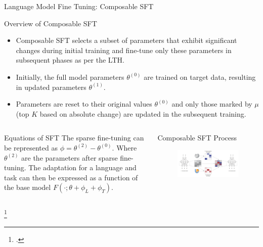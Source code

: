 \documentclass{beamer}
\begin{document}
	\begin{frame}{Language Model Fine Tuning: Composable SFT}
		\begin{block}{\scriptsize Overview of Composable SFT}\scriptsize
			\begin{itemize}
				\item Composable SFT selects a subset of parameters that exhibit significant changes during initial training and fine-tune only these parameters in subsequent phases as per the LTH.
				\item  Initially, the full model parameters $\theta^{(0)}$ are trained on target data, resulting in updated parameters $\theta^{(1)}$. 
				\item Parameters are reset to their original values $\theta^{(0)}$ and only those marked by $\mu$ (top $K$ based on absolute change) are updated in the subsequent training.
			\end{itemize}		  
		\end{block}
		\begin{columns}
			\begin{block}{\scriptsize Equations of SFT}\scriptsize
				The sparse fine-tuning can be represented as $ \phi = \theta^{(2)} - \theta^{(0)}$. Where $\theta^{(2)}$ are the parameters after sparse fine-tuning. The adaptation for a language and task can then be expressed as a function of the base model $F(\cdot; \theta + \phi_L + \phi_T)$.
			\end{block}
			\begin{block}{\scriptsize Composable SFT Process\footnotemark}
				\begin{figure}
					\centering
					\includegraphics[width=\textwidth]{composable-sft}
				\end{figure}
			\end{block}
		\end{columns}\footcitetext{ansell2023composable}
	\end{frame}
	
\end{document}
